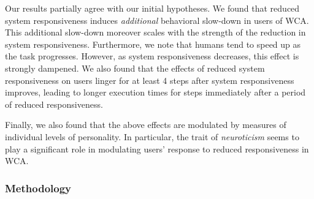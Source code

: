 Our results partially agree with our initial hypotheses.
We found that reduced system responsiveness induces \emph{additional} behavioral slow-down in users of \gls{WCA}.
This additional slow-down moreover scales with the strength of the reduction in system responsiveness.
Furthermore, we note that humans tend to speed up as the task progresses.
However, as system responsiveness decreases, this effect is strongly dampened.
We also found that the effects of reduced system responsiveness on users linger for at least \num{4} steps after system responsiveness improves, leading to longer execution times for steps immediately after a period of reduced responsiveness.

Finally, we also found that the above effects are modulated by measures of individual levels of personality.
In particular, the trait of \emph{neuroticism} seems to play a significant role in modulating users' response to reduced responsiveness in \gls{WCA}.


\subsubsection{Methodology}

